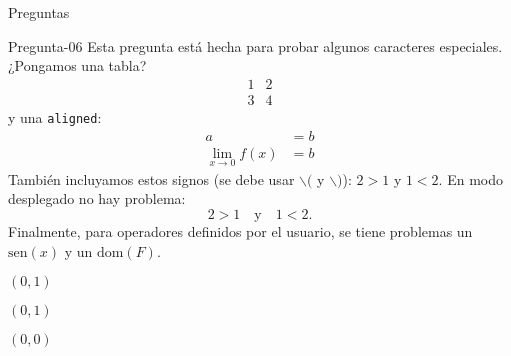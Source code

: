 \documentclass[a4,11pt]{aleph-notas}
\begin{document}
\begin{quiz}{Preguntas}
\begin{multi}[]%
    {Pregunta-06}
    Esta pregunta está hecha para probar algunos caracteres especiales. ¿Pongamos una tabla?
    \[
        \begin{array}{c|c}
            1 & 2 \\\hline
            3 & 4
        \end{array}
    \]
    y una \texttt{aligned}:
    \[
        \begin{aligned}
            a & = b\\
            \lim_{x\to0 }f(x) & = b
        \end{aligned}
    \]
    También incluyamos estos signos (se debe usar $\backslash($ y $\backslash)$): \(2>1\) y \(1<2\). En modo desplegado no hay problema:
    \[
        2>1 \quad\text{y}\quad 1<2. 
    \]
    Finalmente, para operadores definidos por el usuario, se tiene problemas
    un $\text{sen}(x)$
    y 
    un $\text{dom}(F)$.
    \item $(0,1)$
    \item $(0,1)$
    \item* $(0,0)$
\end{multi}

\end{quiz}
\end{document}
